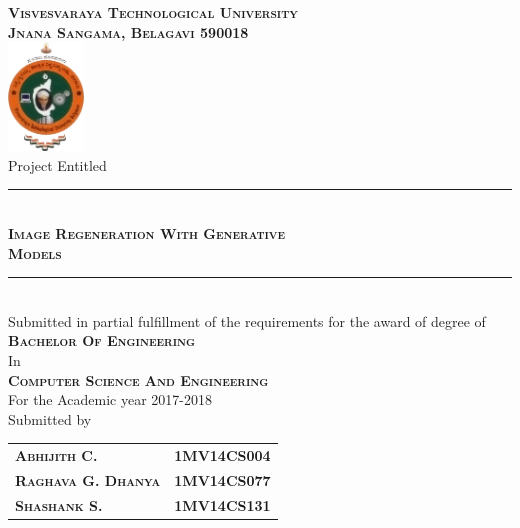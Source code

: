 

\begin{titlepage} %
	\newcommand{\HRule}{\rule{\linewidth}{0.5mm}} %

	\center %

	\textsc{\Large \textbf{Visvesvaraya Technological University\\[3pt]Jnana Sangama, Belagavi 590018}}\\[10pt] 
	\includegraphics[width=0.15\textwidth]{images/vtu.png}\\[10pt] 

	{\large Project Entitled}\\[10pt] %


	\HRule\\[10pt]
	\textsc{ \textbf{\LARGE Image Regeneration With Generative \\[5pt] Models}}\\[10pt]

	\HRule\\[10pt]
	Submitted in partial fulfillment of the requirements for the award of degree of\\
	\large{
		\textsc{
		\textbf{Bachelor Of Engineering}}\\
		In \\
		\textsc{
		\textbf{Computer Science And Engineering}} \\
		For the Academic year 2017-2018 
	}\\[10pt]
	\large{Submitted by}\\[2pt]
	\begin{tabular}{ l r }
		\textsc{\large \textbf{Abhijith C.}}       & \large \textbf{1MV14CS004} \\
		\textsc{\large \textbf{Raghava G. Dhanya}} & \large \textbf{1MV14CS077} \\
		\textsc{\large \textbf{Shashank S.}}       & \large \textbf{1MV14CS131}
	\end{tabular}\\[15pt]


\end{titlepage}
